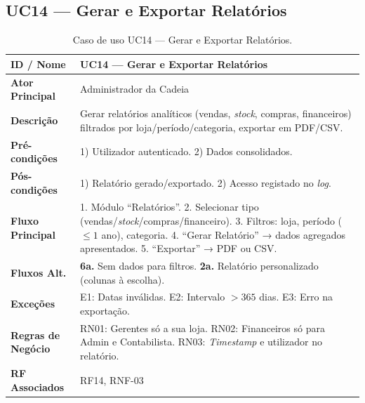 \documentclass[a4paper,12pt]{scrreprt}
\begin{document}
\subsection*{UC14 --- Gerar e Exportar Relatórios}
\begin{table}[H]
\centering\small
\begin{tabular}{|p{3cm}|p{11cm}|}
\hline
\textbf{ID / Nome} & UC14 --- Gerar e Exportar Relatórios \\
\hline
\textbf{Ator Principal} & Administrador da Cadeia \\
\hline
\textbf{Descrição} & Gerar relatórios analíticos (vendas, \textit{stock}, compras, financeiros) filtrados por loja/período/categoria, exportar em PDF/CSV. \\
\hline
\textbf{Pré-condições} & 1) Utilizador autenticado. 2) Dados consolidados. \\
\hline
\textbf{Pós-condições} & 1) Relatório gerado/exportado. 2) Acesso registado no \textit{log}. \\
\hline
\textbf{Fluxo Principal} & 1. Módulo ``Relatórios''. 2. Selecionar tipo (vendas/\textit{stock}/compras/financeiro). 3. Filtros: loja, período ($\leq 1$ ano), categoria. 4. ``Gerar Relatório'' → dados agregados apresentados. 5. ``Exportar'' → PDF ou CSV. \\
\hline
\textbf{Fluxos Alt.} & \textbf{6a.} Sem dados para filtros. \textbf{2a.} Relatório personalizado (colunas à escolha). \\
\hline
\textbf{Exceções} & E1: Datas inválidas. E2: Intervalo $> 365$ dias. E3: Erro na exportação. \\
\hline
\textbf{Regras de Negócio} & RN01: Gerentes só a sua loja. RN02: Financeiros só para Admin e Contabilista. RN03: \textit{Timestamp} e utilizador no relatório. \\
\hline
\textbf{RF Associados} & RF14, RNF-03 \\
\hline
\end{tabular}
\caption{Caso de uso UC14 --- Gerar e Exportar Relatórios.}
\end{table}

\end{document}
